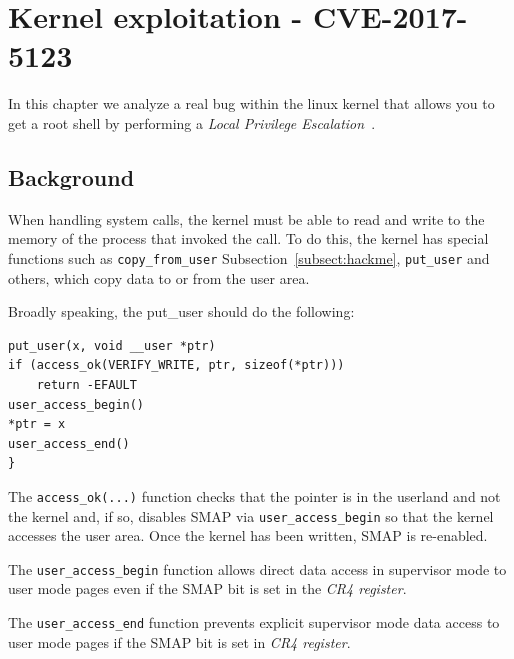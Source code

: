 \documentclass{masterthesis}
\newcommand{\refToSubSection}[1]{Subsection~\ref{subsect:#1}\xspace}
\begin{document}
\chapter{Kernel exploitation - CVE-2017-5123}
\label{ch:cve-2017}
In this chapter we analyze a real bug within the linux kernel that allows you to get a root shell by performing a \emph{Local Privilege Escalation}~\cite{farah2017study}.
\section{Background}
\label{sect:back-cve-2017}
When handling system calls, the kernel must be able to read and write to the memory of the process that invoked the call. To do this, the kernel has special functions such as \lstinline{copy_from_user} \refToSubSection{hackme}, \lstinline{put_user} and others, which copy data to or from the user area.

Broadly speaking, the put_user should do the following:
\begin{lstlisting}
put_user(x, void __user *ptr)
if (access_ok(VERIFY_WRITE, ptr, sizeof(*ptr)))
    return -EFAULT
user_access_begin()
*ptr = x
user_access_end()
}
\end{lstlisting}
The \lstinline{access_ok(...)} function checks that the pointer is in the userland and not the kernel and, if so, disables SMAP via \lstinline{user_access_begin} so that the kernel accesses the user area. Once the kernel has been written, SMAP is re-enabled.

The \texttt{user_access_begin} function allows direct data access in supervisor mode to user mode pages even if the SMAP bit is set in the \emph{CR4 register}.

The \texttt{user_access_end} function prevents explicit supervisor mode data access to user mode pages if the SMAP bit is set in \emph{CR4 register}.
\end{document}
